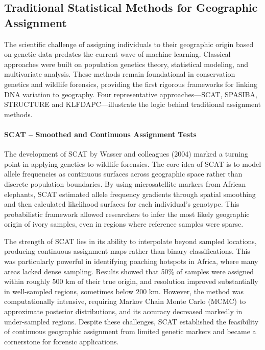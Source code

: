 \documentclass[twocolumn,10pt]{article}
\begin{document}
\subsection*{Traditional Statistical Methods for Geographic Assignment}

The scientific challenge of assigning individuals to their geographic origin based on genetic data
predates the current wave of machine learning. Classical approaches were built on population
genetics theory, statistical modeling, and multivariate analysis. These methods remain foundational
in conservation genetics and wildlife forensics, providing the first rigorous frameworks for linking
DNA variation to geography. Four representative approaches—SCAT, SPASIBA, STRUCTURE and
KLFDAPC—illustrate the logic behind traditional assignment methods.

\paragraph{SCAT – Smoothed and Continuous Assignment Tests}

The development of SCAT by Wasser and colleagues (2004) \citep{wasser2004assigning} marked a turning
point in applying genetics to wildlife forensics. The core idea of SCAT is to model allele
frequencies as continuous surfaces across geographic space rather than discrete population
boundaries. By using microsatellite markers from African elephants, SCAT estimated allele frequency
gradients through spatial smoothing and then calculated likelihood surfaces for each individual's
genotype. This probabilistic framework allowed researchers to infer the most likely geographic
origin of ivory samples, even in regions where reference samples were sparse.

The strength of SCAT lies in its ability to interpolate beyond sampled locations, producing
continuous assignment maps rather than binary classifications. This was particularly powerful in
identifying poaching hotspots in Africa, where many areas lacked dense sampling. Results showed that
50\% of samples were assigned within roughly 500 km of their true origin, and resolution improved
substantially in well-sampled regions, sometimes below 200 km. However, the method was
computationally intensive, requiring Markov Chain Monte Carlo (MCMC) to approximate posterior
distributions, and its accuracy decreased markedly in under-sampled regions. Despite these
challenges, SCAT established the feasibility of continuous geographic assignment from limited
genetic markers and became a cornerstone for forensic applications.
\end{document}
